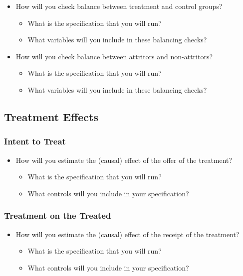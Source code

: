 \documentclass[12pt]{article}
\begin{document}
\begin{itemize}
\item How will you check balance between treatment and control groups? 
\begin{itemize}
\item What is the specification that you will run?
\item What variables will you include in these balancing checks?
\end{itemize}
\item How will you check balance between attritors and non-attritors? 
\begin{itemize}
\item What is the specification that you will run?
\item What variables will you include in these balancing checks?
\end{itemize}
\end{itemize}

\subsection{Treatment Effects}

\subsubsection{Intent to Treat}

\begin{itemize}
\item How will you estimate the (causal) effect of the offer of the treatment? 
\begin{itemize}
\item What is the specification that you will run?
\item What controls will you include in your specification?
\end{itemize}
\end{itemize}

\subsubsection{Treatment on the Treated}

\begin{itemize}
\item How will you estimate the (causal) effect of the receipt of the treatment? 
\begin{itemize}
\item What is the specification that you will run?
\item What controls will you include in your specification?
\end{itemize}
\end{itemize}
\end{document}
